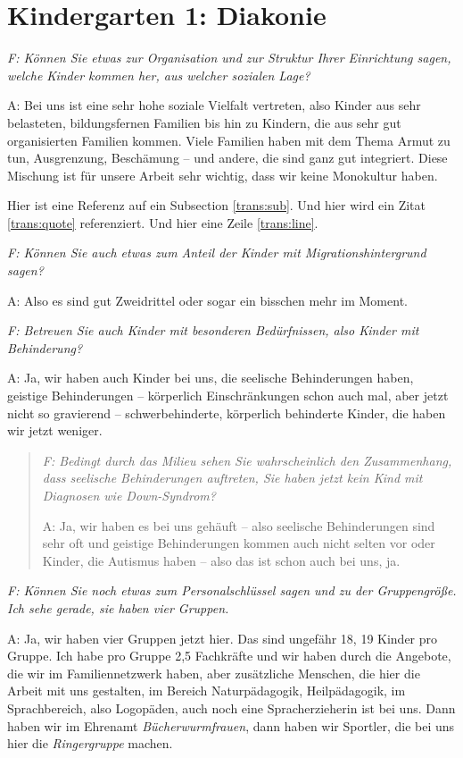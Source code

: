 \section{Kindergarten 1: Diakonie}
\begin{linenumbers}
\emph{F: Können Sie etwas zur Organisation und zur Struktur Ihrer Einrichtung sagen, welche Kinder kommen her, aus welcher sozialen Lage?}

A: Bei uns ist eine sehr hohe soziale Vielfalt vertreten, also Kinder aus sehr belasteten, bildungsfernen Familien bis hin zu Kindern, die aus sehr gut organisierten Familien kommen. Viele Familien haben mit dem Thema Armut zu tun, Ausgrenzung, Beschämung -- und andere, die sind ganz gut integriert. Diese Mischung ist für unsere Arbeit sehr wichtig, dass wir keine Monokultur haben.

Hier ist eine Referenz auf ein Subsection \ref{trans:sub}. Und hier wird ein Zitat \ref{trans:quote} referenziert. Und hier eine Zeile \ref{trans:line}.


\emph{F: Können Sie auch etwas zum Anteil der Kinder mit Migrationshintergrund sagen?}

A: Also es sind gut Zweidrittel oder sogar ein bisschen mehr im Moment. 

\emph{F: Betreuen Sie auch Kinder mit besonderen Bedürfnissen, also Kinder mit Behinderung?}

\label{trans:sub}
A: Ja, wir haben auch Kinder bei uns, die seelische Behinderungen haben, geistige Behinderungen -- körperlich Einschränkungen schon auch mal, aber jetzt nicht so gravierend -- schwerbehinderte, körperlich behinderte Kinder, die haben wir jetzt weniger.

\begin{quote}
\label{trans:quote}
\emph{F: Bedingt durch das Milieu sehen Sie wahrscheinlich den Zusammenhang, dass seelische Behinderungen auftreten, Sie haben jetzt kein Kind mit Diagnosen wie Down-Syndrom?} 

A: Ja, wir haben es bei uns gehäuft -- also seelische Behinderungen sind sehr oft und geistige Behinderungen kommen auch nicht selten vor oder Kinder, die Autismus haben -- also das ist schon auch bei uns, ja.
\end{quote}

\emph{F: Können Sie noch etwas zum Personalschlüssel sagen und zu der Gruppengröße. Ich sehe gerade, sie haben vier Gruppen.}

A: Ja, wir haben vier Gruppen jetzt hier. Das sind ungefähr 18, 19 Kinder pro Gruppe. Ich habe pro Gruppe 2,5 Fachkräfte und wir haben  durch die Angebote, die wir im Familiennetzwerk haben, aber zusätzliche Menschen, die hier die Arbeit mit uns gestalten,  im Bereich Naturpädagogik, Heilpädagogik, im Sprachbereich, also Logopäden, auch noch eine Spracherzieherin ist bei uns. Dann haben wir im Ehrenamt \emph{Bücherwurmfrauen}, dann haben wir Sportler, die bei uns hier die \emph{Ringergruppe} machen. 


\end{linenumbers}
